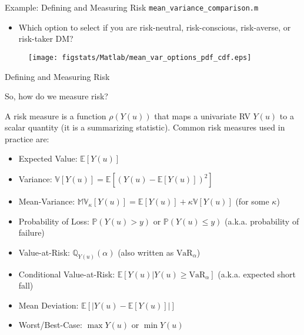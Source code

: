 \documentclass[9pt]{beamer}
\begin{document}
%
\begin{frame}{Example: Defining and Measuring Risk \footnotesize{\texttt{mean\_variance\_comparison.m}}}
\begin{itemize}
\item Which option to select if you are risk-neutral, risk-conscious, risk-averse, or risk-taker DM?
\end{itemize}
\begin{figure}[!htb]
    \centering
	\texttt{[image: figstats/Matlab/mean\_var\_options\_pdf\_cdf.eps]}
\end{figure}

\end{frame}

%
\begin{frame}{Defining and Measuring Risk}
\begin{block}{}
So, how do we measure risk? 
\end{block}

A risk measure is a function $\rho(Y(u))$ that maps a univariate RV $Y(u)$ to a scalar quantity (it is a summarizing statistic). Common risk measures used in practice are:
\begin{itemize}
   \setlength{\itemsep}{10pt}
\item Expected Value: $\mathbb{E}[Y(u)]$
\item Variance: $\mathbb{V}[Y(u)]=\mathbb{E}[(Y(u)-\mathbb{E}[Y(u)])^2]$
\item Mean-Variance: $\mathbb{MV}_\kappa[Y(u)]=\mathbb{E}[Y(u)]+\kappa \mathbb{V}[Y(u)]$ (for some $\kappa$)
\item Probability of Loss: $\mathbb{P}(Y(u)>y)$ or $\mathbb{P}(Y(u)\leq y)$ (a.k.a. probability of failure)
\item Value-at-Risk: $\mathbb{Q}_{Y(u)}(\alpha)$ (also written as $\textrm{VaR}_\alpha$)
\item Conditional Value-at-Risk: $\mathbb{E}[Y(u)|Y(u)\geq \textrm{VaR}_\alpha]$ (a.k.a. expected short fall) 
\item Mean Deviation:  $\mathbb{E}[|Y(u)-\mathbb{E}[Y(u)]|]$
\item Worst/Best-Case: $\max Y(u)$ or $\min Y(u)$
\end{itemize}

\end{frame}
\end{document}
